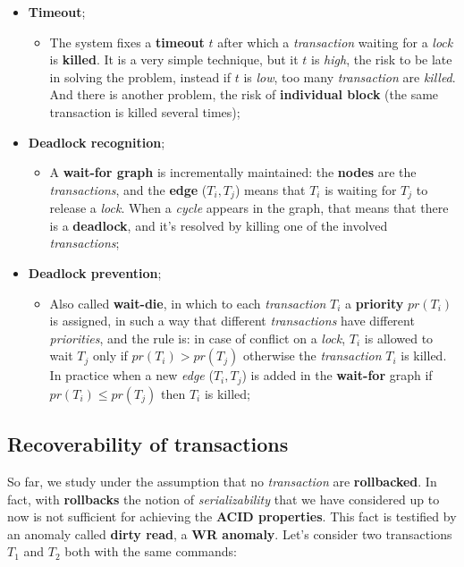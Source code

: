 \documentclass{article}
\begin{document}
\begin{itemize}
\item \textbf{Timeout};
\begin{itemize}
\item The system fixes a \textbf{timeout} $t$ after which a \emph{transaction} waiting for a \emph{lock} is \textbf{killed}. It is a very simple technique, but it $t$ is \emph{high}, the risk to be late in solving the problem, instead if $t$ is \emph{low}, too many \emph{transaction} are \emph{killed}. And there is another problem, the risk of \textbf{individual block} (the same transaction is killed several times);
\end{itemize}
\item \textbf{Deadlock recognition};
\begin{itemize}
\item A \textbf{wait-for graph} is incrementally maintained: the \textbf{nodes} are the \emph{transactions}, and the \textbf{edge} ($T_i,T_j$) means that $T_i$ is waiting for $T_j$ to release a \emph{lock}. When a \emph{cycle} appears in the graph, that means that there is a \textbf{deadlock}, and it's resolved by killing one of the involved \emph{transactions};
\end{itemize}
\item \textbf{Deadlock prevention};
\begin{itemize}
\item Also called \textbf{wait-die}, in which to each \emph{transaction} $T_i$ a \textbf{priority} $pr(T_i)$ is assigned, in such a way that different \emph{transactions} have different \emph{priorities}, and the rule is: in case of conflict on a \emph{lock}, $T_i$ is allowed to wait $T_j$ only if $pr(T_i) > pr(T_j)$ otherwise the \emph{transaction} $T_i$ is killed. In practice when a new \emph{edge} ($T_i,T_j$) is added in the \textbf{wait-for} graph if $pr(T_i) \leq pr(T_j)$ then $T_i$ is killed;
\end{itemize}
\end{itemize}
\subsection{Recoverability of transactions}
So far, we study under the assumption that no \emph{transaction} are \textbf{rollbacked}. In fact, with \textbf{rollbacks} the notion of \emph{serializability} that we have considered up to now is not sufficient for achieving the \textbf{ACID properties}. This fact is testified by an anomaly called \textbf{dirty read}, a \textbf{WR anomaly}. Let's consider two transactions $T_1$ and $T_2$ both with the same commands:\\
\end{document}
